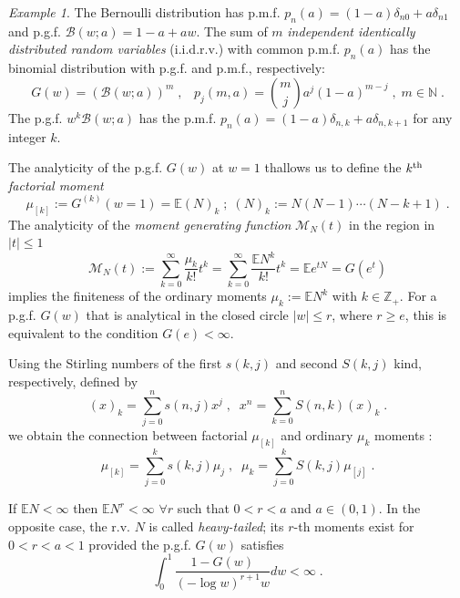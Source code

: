 \documentclass[a4paper,12pt]{amsart}
\newcommand{\E}{\mathbb{E}}
\newcommand{\N}{\mathbb{N}}
\newcommand{\Z}{\mathbb{Z}_{+}}
\newcommand{\iid}{i.i.d.}
\theoremstyle{definition}
\theoremstyle{remark}
\newtheorem{Example}{Example}[section]
\begin{document}
\begin{Example}
The Bernoulli distribution has p.m.f. $p_n(a)=(1-a)\delta_{n0}+a\delta_{n1}$ and p.g.f. $\mathcal{B}(w; a)=1-a +aw$. The sum of $m$ {\it independent identically distributed random variables} (\iid{}r.v.)  with common p.m.f. $p_n(a)$ has the binomial distribution with p.g.f.  and p.m.f., respectively:
\begin{equation}\label{Binom}
G(w)=(\mathcal{B} (w;a))^m\;,\; \;\; p_j(m,a)=\binom{m}{j}a^j(1-a)^{m-j}\;,\; m\in \N\;.   
\end{equation}
The p.g.f. $w^k\mathcal{B}(w;a)$ has the p.m.f. $p_n(a)=(1-a)\delta_{n,k}+a\delta_{n,k+1}$ for any integer $k$.
\end{Example}

The analyticity of the p.g.f. $G(w)$ at $w=1$ thallows us to define the $k^{\rm th}$ {\it factorial moment} 
\begin{equation} \label{facmom}
\mu_{[k]} := G^{(k)}(w=1)   =\E(N)_k \;;\; (N)_k:=N(N\!-\!1)\cdots (N\!-\!k\!+\!1)\;.
\end{equation}
The analyticity of the {\it moment generating function} $\mathcal{M}_N(t)$ in the region in $|t|\leq 1$ 
\begin{equation}\label{mgf}
\mathcal{M}_N(t):= \sum_{k=0}^{\infty}\frac{\mu_k}{k!}t^k=\sum_{k=0}^{\infty}\frac{\mathbb{E}N^k}{k!}t^k=\mathbb{E}e^{tN}=G(e^t)  
\end{equation}
implies the finiteness of  the ordinary moments $\mu_k:=\E N^k$ with $k\in\Z $. For a p.g.f. $G(w)$ that is analytical in the closed circle $|w|\leq r$, where  $r\geq e$, this is equivalent to the condition $G(e)<\infty$.

Using the Stirling numbers of the first $s(k,j)$ and second $S(k,j)$ kind, respectively, defined by
\[
(x)_k=\sum_{j=0}^n s(n,j)x^j\;,\;\; x^n=\sum_{k=0}^n S(n,k)(x)_k\;.
\]
we obtain the connection between factorial $\mu_{[k]}$ and ordinary $\mu_k$ moments \cite{JKK2005}:
\begin{equation}\label{frac2norm}
 \mu_{[k]} = \sum_{j=0}^k s(k,j)\mu_j\;,\;\; \mu_k=\sum_{j=0}^k S(k,j)\mu_{[j]}\;.
\end{equation}

If $\E N<\infty$ then $\E N^r <\infty$ $\forall r$ such that $0<r<a$ and $a\in (0,1)$. In the opposite case, the r.v. $N$ is called {\it heavy-tailed}; its $r$-th moments exist for $0 < r < a < 1$ provided the p.g.f. $G(w)$ satisfies \cite{Klebanov2023-xj, KS2208}
\begin{equation}\label{momheavy}
 \int_0^{1}\frac{1-G(w)}{(-\log w)^{r+1}w}dw<\infty \;. 
\end{equation}
\end{document}

